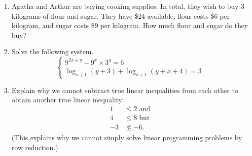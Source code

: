 \documentclass[a4paper,leqno]{article}
\numberwithin{equation}{section}
\theoremstyle{definition}
\theoremstyle{remark}
\begin{document}
\begin{enumerate}
\begin{center}
      \hspace*{\fill}
    \end{center}
  \item Agatha and Arthur are buying cooking supplies. In total, they wish to buy 3 kilograms of flour and sugar. They
        have \$24 available; flour costs \$6 per kilogram, and sugar costs \$9 per kilogram. How much flour and sugar do they buy?
  \item Solve the following system.
        \begin{displaymath}
          \begin{cases}
          9^{2x+y} - 9^x \times 3^y = 6\\
          \log_{x+1}(y+3) + \log_{x+1}(y+x+4) = 3
          \end{cases}
        \end{displaymath}
  \item Explain why we cannot subtract true linear inequalities from each other to obtain another true linear inequality:
        \begin{align*}
          1 &\leq 2 \text{ and}\\
          4 &\leq 8 \text{ but}\\
          -3 &\not\leq -6.
        \end{align*}
        (This explains why we cannot simply solve linear programming problems by row reduction.)

\end{enumerate}
\end{document}
